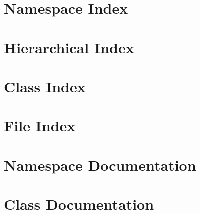 \documentclass[twoside]{book}
\newcommand{\+}{\discretionary{\mbox{\scriptsize$\hookleftarrow$}}{}{}}
\begin{document}
  \raggedbottom
    \hypersetup{pageanchor=false,
                bookmarksnumbered=true,
                pdfencoding=unicode
               }
  \hypersetup{pageanchor=true}

\chapter{Namespace Index}

\chapter{Hierarchical Index}

\chapter{Class Index}

\chapter{File Index}

\chapter{Namespace Documentation}



\chapter{Class Documentation}










\end{document}
